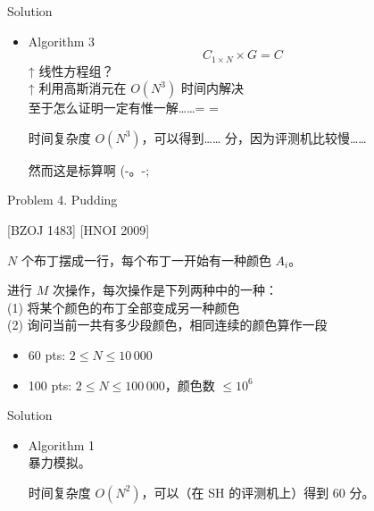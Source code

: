 \documentclass[UTF8]{beamer}
\begin{document}
\begin{frame}{Solution}
\begin{itemize}
    \item Algorithm 3 \\
        $$
            C_{1 \times N} \times G = C
        $$
        \pause ↑ 线性方程组？ \\
        \pause ↑ 利用高斯消元在 $O(N^3)$ 时间内解决 \\
        \pause 至于怎么证明一定有惟一解……= =

        时间复杂度 $O(N^3)$，可以得到……
         分，因为评测机比较慢……

        \pause 然而这是标算啊 (-。-;
\end{itemize}

\end{frame}


\begin{frame}{Problem 4. Pudding}

[BZOJ 1483] [HNOI 2009]

$N$ 个布丁摆成一行，每个布丁一开始有一种颜色 $A_i$。

进行 $M$ 次操作，每次操作是下列两种中的一种： \\
(1) 将某个颜色的布丁全部变成另一种颜色 \\
(2) 询问当前一共有多少段颜色，相同连续的颜色算作一段

\begin{itemize}
    \item 60 pts: $2 \leq N \leq 10\,000$
    \item 100 pts: $2 \leq N \leq 100\,000$，颜色数 $\leq 10^6$
\end{itemize}

\end{frame}

\begin{frame}{Solution}

\begin{itemize}
    \item Algorithm 1 \\
        暴力模拟。

        时间复杂度 $O(N^2)$，可以（在 SH 的评测机上）得到 60 分。
\end{itemize}

\end{frame}
\end{document}
